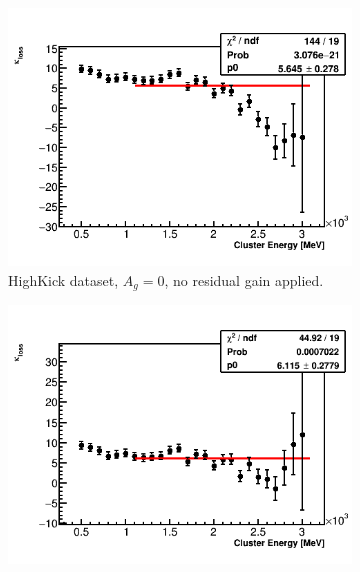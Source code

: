 \begin{landscape}
\begin{figure}[h]
\centering
    \begin{subfigure}[t]{0.4\textwidth}
        \centering
        \includegraphics[width=\textwidth]{TMethod_kappa_loss_Vs_EBin_Canv_HK-0}
        \caption{HighKick dataset, $A_{g} = 0$, no residual gain applied.}
    \end{subfigure}%
    \hspace{1cm}
    \begin{subfigure}[t]{0.4\textwidth}
        \centering
        \includegraphics[width=\textwidth]{TMethod_kappa_loss_Vs_EBin_Canv_HK-5p1}

\end{subfigure}
\end{figure}
\end{landscape}
